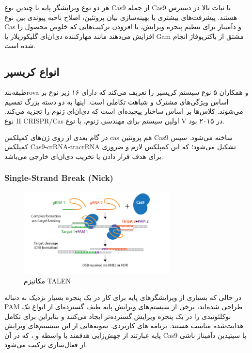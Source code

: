 \documentclass[12pt,a4paper,BCOR=.7cm,headsepline,bibliography=totoc]{report}
\begin{document}
هر دو نوع ویرایشگر پایه با چندین نوع Cas9 از جمله Cas9 با ثبات بالا در دسترس هستند. پیشرفت‌های بیشتری با بهینه‌سازی بیان پروتئین، اصلاح ناحیه پیوندی بین نوع Cas و دآمیناز برای تنظیم پنجره ویرایش، یا افزودن ترکیب‌هایی که خلوص محصول را افزایش می‌دهند مانند مهارکننده دی‌ان‌ای گلیکوزیلاز  یا Gam مشتق از باکتریوفاژ  انجام شده است.






\subsection{انواع کریسپر}
طبقه‌بندrova و همکاران ۵ نوع سیستم کریسپر را تعریف می‌کند که دارای ۱۶ زیر نوع بر اساس ویژگی‌های مشترک و شباهت تکاملی است. اینها به دو دسته بزرگ تقسیم می‌شوند. کلاس‌ها بر اساس ساختار پیچیده‌ای است که دی‌ان‌ای ژنوم را تجزیه می‌کند. نوع II CRISPR/Cas اولین سیستم برای مهندسی ژنوم، با نوع V در ۲۰۱۵ بود.

در گام بعدی از روی ژن‌های کمپلکس cas هم پروتئین Cas9 ساخته می‌شود. سپس کمپلکس Cas9-crRNA-tracrRNA تشکیل می‌شود؛ که این کمپلکس لازم و ضروری برای هدف قرار دادن یا تخریب دی‌ان‌ای خارجی می‌باشد.

\subsubsection{ Single-Strand Break (Nick)}
\begin{figure}
\centering
\includegraphics[width=8cm, ]{pictures/nick.png}
\caption{
مکانیزم TALEN \cite{addgene}
}\label{wrap-fig:4}
\end{figure}
در حالی که بسیاری از ویرایشگرهای پایه برای کار در یک پنجره بسیار نزدیک به دنباله PAM طراحی شده‌اند، برخی از سیستم‌های ویرایش پایه طیف گسترده‌ای از انواع تک نوکلئوتیدی  را در یک پنجره ویرایش گسترده‌تر ایجاد می‌کنند و بنابراین برای تکامل هدایت‌شده مناسب هستند. برنامه های کاربردی. نمونه‌هایی از این سیستم‌های ویرایش پایه عبارتند از جهش‌زایی هدفمند با واسطه  و ، که در آن Cas9 با سیتیدین دآمیناز  ناشی از فعال‌سازی ترکیب می‌شود.
\end{document}

